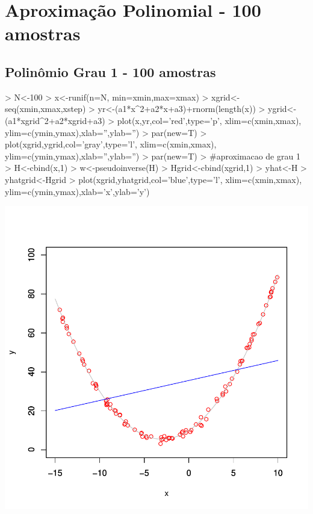\documentclass{article}
\begin{document}
\newpage
\section{Aproximação Polinomial - 100 amostras}

\subsection{Polinômio Grau 1 - 100 amostras}

\begin{Schunk}
\begin{Sinput}
>   N<-100
>   x<-runif(n=N, min=xmin,max=xmax)
>   xgrid<-seq(xmin,xmax,xstep)
>   yr<-(a1*x^2+a2*x+a3)+rnorm(length(x))
>   ygrid<-(a1*xgrid^2+a2*xgrid+a3)
>   plot(x,yr,col='red',type='p', xlim=c(xmin,xmax), ylim=c(ymin,ymax),xlab='',ylab='')
>   par(new=T)
>   plot(xgrid,ygrid,col='gray',type='l', xlim=c(xmin,xmax), ylim=c(ymin,ymax),xlab='',ylab='')
>   par(new=T)
>   #aproximacao de grau 1
>   H<-cbind(x,1)
>   w<-pseudoinverse(H) %
>   Hgrid<-cbind(xgrid,1)
>   yhat<-H%
>   yhatgrid<-Hgrid%
>   plot(xgrid,yhatgrid,col='blue',type='l', xlim=c(xmin,xmax), ylim=c(ymin,ymax),xlab='x',ylab='y')
\end{Sinput}
\end{Schunk}
\includegraphics{aproximacao_polinomial-010}
\end{document}
